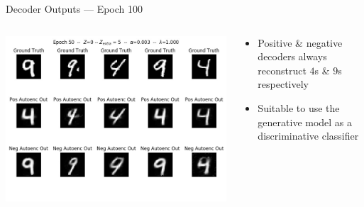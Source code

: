 \documentclass[11pt,dvipsnames,usenames,aspectratio=169]{beamer}  %
\newcommand{\blue}[1]{{\color{Blue} #1}}
\newcommand{\red}[1]{{\color{red} #1}}
\begin{document}
\begin{frame}{Decoder Outputs --- Epoch \red{100}}
  \begin{columns}
    \begin{column}{0.59\textwidth}
      \begin{center}
        \includegraphics[scale=0.44]{deep-pu_epoch=050.jpg}
      \end{center}
    \end{column}
    \begin{column}{0.41\textwidth}
      \begin{itemize}[<+->]
        \setlength{\itemsep}{20pt}
        \item Positive \& negative decoders always reconstruct \blue{$4$}s \& \red{$9$}s respectively
        \item Suitable to use the generative model as a discriminative classifier
      \end{itemize}
    \end{column}
  \end{columns}
\end{frame}
\end{document}
